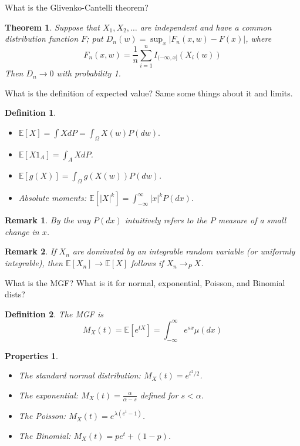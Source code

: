 \documentclass[avery5388,grid,frame]{flashcards}
\newcommand{\E}{\mathbb{E}}
\newtheorem*{theorem}{Theorem}
\newtheorem*{definition}{Definition}
\newtheorem*{properties}{Properties}
\newtheorem*{remark}{Remark}
\begin{document}
\begin{flashcard}
    {What is the Glivenko-Cantelli theorem?}
    \begin{theorem}
        Suppose that $X_1, X_2, \dots$ are independent and have a common distribution function $F$; put $D_n(w) = \sup_x |F_n(x, w) - F(x)|$, where
        $$F_n(x,w) = \frac 1 n \sum_{i=1}^n I_{(-\infty,x]}(X_i(w))$$
        Then $D_n \rightarrow 0$ with probability 1.
    \end{theorem}
\end{flashcard}


\begin{flashcard}
    {What is the definition of expected value? Same some things about it and limits.}
    \begin{definition}
        \begin{itemize}
            \item $\E[X] = \int X dP = \int_\Omega X(w) P(dw).$
            \item $\E[X 1_A] = \int_A X dP$.
            \item $\E[g(X)] = \int_\Omega g(X(w)) P(dw)$.
            \item Absolute moments: $\E[|X|^k] = \int_{-\infty}^\infty |x|^k P(dx)$.
        \end{itemize}
    \end{definition}

    \begin{remark}
        By the way $P(dx)$ intuitively refers to the $P$ measure of a small change in $x$.
    \end{remark}
    \begin{remark}
        If $X_n$ are dominated by an integrable random variable (or uniformly integrable), then $\E[X_n] \rightarrow \E[X]$ follows if $X_n \rightarrow_P X$.
    \end{remark}
\end{flashcard}


\begin{flashcard}
    {What is the MGF? What is it for normal, exponential, Poisson, and Binomial dists?}
    \begin{definition}
        The MGF is
        $$M_X(t) = \E[e^{tX}] = \int_{-\infty}^\infty e^{sx} \mu(dx)$$
    \end{definition}

    \begin{properties}
        \begin{itemize}
            \item The standard normal distribution: $M_X(t) = e^{t^2/2}$.
            \item The exponential: $M_X(t) = \frac{\alpha}{\alpha - s}$ defined for $s < \alpha$.
            \item The Poisson: $M_X(t) = e^{\lambda (e^t - 1)}$.
            \item The Binomial: $M_X(t) = p e^t + (1-p)$.
        \end{itemize}
    \end{properties}
\end{flashcard}
\end{document}

